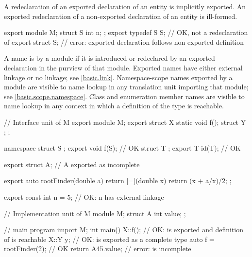 \begin{std.txt}
  \pnum
  A redeclaration of an exported declaration of an entity
  is implicitly exported.
  An exported redeclaration of a non-exported declaration
  of an entity is ill-formed.
  \begin{example}
  \begin{codeblock}
  export module M;
  struct S { int n; };
  export typedef S S;   // OK, not a redeclaration of 
  export struct S;      // error: exported declaration follows non-exported definition
  \end{codeblock}
  \end{example}

  \pnum
  A name is  by a module
  if it is introduced or redeclared
  by an exported declaration in the purview of that module.
  \enternote
  Exported names have either external linkage or no linkage; see \ref{basic.link}.
  Namespace-scope names exported by a module are visible to name lookup
  in any translation unit importing that module; see \ref{basic.scope.namespace}.
  Class and enumeration member names are visible to name lookup in any
  context in which a definition of the type is reachable.
  \exitnote
  \begin{example}
    \begin{codeblock}
      // Interface unit of M
      export module M;
      export struct X {
        static void f();
        struct Y { };
      };

      namespace {
        struct S { };
      }
      export void f(S);    // OK
      struct T { };
      export T id(T);      // OK
  
      export struct A;     // A exported as incomplete

      export auto rootFinder(double a) {
        return [=](double x) { return (x + a/x)/2; };
      }

      export const int n = 5; // OK: n has external linkage
  
      // Implementation unit of M
      module M;
      struct A {
        int value;
      };
  
      // main program
      import M;
      int main() {
        X::f();                 // OK:  is exported and definition of  is reachable
        X::Y y;                 // OK:  is exported as a complete type
        auto f = rootFinder(2); // OK
        return A{45}.value;     // error:  is incomplete
      }
      \end{codeblock}
  \end{example}


\end{std.txt}
